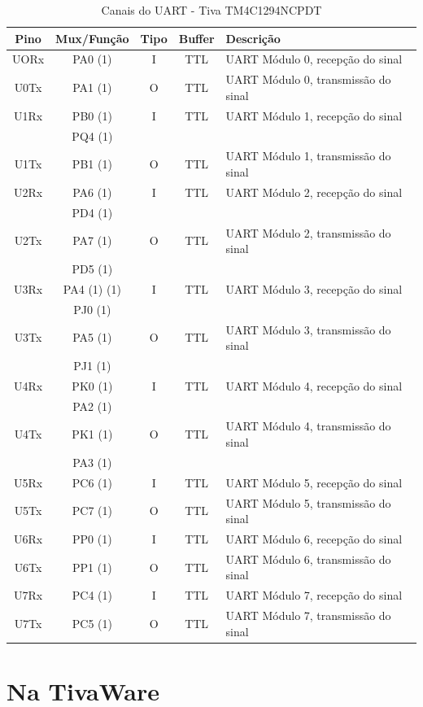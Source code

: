\begin{table}[H]
	\centering
	\caption{Canais do UART - Tiva TM4C1294NCPDT \cite{DATASHEET_TIVA} }
	\label{tab:CanaisUART}
	\begin{tabular}{|c|c|c|c|l|}
		\rowcolor[HTML]{000000} 
		{\color[HTML]{FFFFFF} Pino}  & {\color[HTML]{FFFFFF} Mux/Função} & {\color[HTML]{FFFFFF} Tipo} & {\color[HTML]{FFFFFF} Buffer} & {\color[HTML]{FFFFFF} Descrição}  \\
		\hline
		UORx  & PA0 (1) & I & TTL & UART Módulo 0, recepção do sinal   \\
		\hline
		U0Tx  & PA1 (1) & O & TTL & UART Módulo 0, transmissão do sinal  \\
		\hline
		\hline
		U1Rx  & PB0 (1) & I & TTL & UART Módulo 1, recepção do sinal   \\
		      & PQ4 (1) &   &     &                                     \\
		\hline
		U1Tx  & PB1 (1) & O & TTL & UART Módulo 1, transmissão do sinal  \\
		\hline
		U2Rx  & PA6 (1) & I & TTL & UART Módulo 2, recepção do sinal   \\
		      & PD4 (1) &   &     &                                      \\
		\hline
		U2Tx  & PA7 (1) & O & TTL & UART Módulo 2, transmissão do sinal  \\
		      & PD5 (1) &   &     &                                      \\
		\hline
		U3Rx  & PA4 (1) (1) & I & TTL & UART Módulo 3, recepção do sinal   \\
	 	      & PJ0 (1) &   &     &                                      \\
		\hline
		U3Tx  & PA5 (1) & O & TTL & UART Módulo 3, transmissão do sinal  \\
	 	      & PJ1 (1) &   &     &                                      \\
		\hline
		U4Rx  & PK0 (1) & I & TTL & UART Módulo 4, recepção do sinal   \\
		      & PA2 (1) &   &     &                                      \\
		\hline
		U4Tx  & PK1 (1) & O & TTL & UART Módulo 4, transmissão do sinal  \\
		      & PA3 (1) &   &     &                                      \\
		\hline
		U5Rx  & PC6 (1) & I & TTL & UART Módulo 5, recepção do sinal\\
		\hline
		U5Tx  & PC7 (1) & O & TTL & UART Módulo 5, transmissão do sinal \\
		\hline
		U6Rx  & PP0 (1) & I & TTL & UART Módulo 6, recepção do sinal \\
		\hline
		U6Tx  & PP1 (1) & O & TTL & UART Módulo 6, transmissão do sinal\\
		\hline
		U7Rx  & PC4 (1) & I & TTL & UART Módulo 7, recepção do sinal \\
		\hline
		U7Tx  & PC5 (1) & O & TTL & UART Módulo 7, transmissão do sinal\\
		\hline
	\end{tabular}
\end{table}


\section{Na TivaWare}

